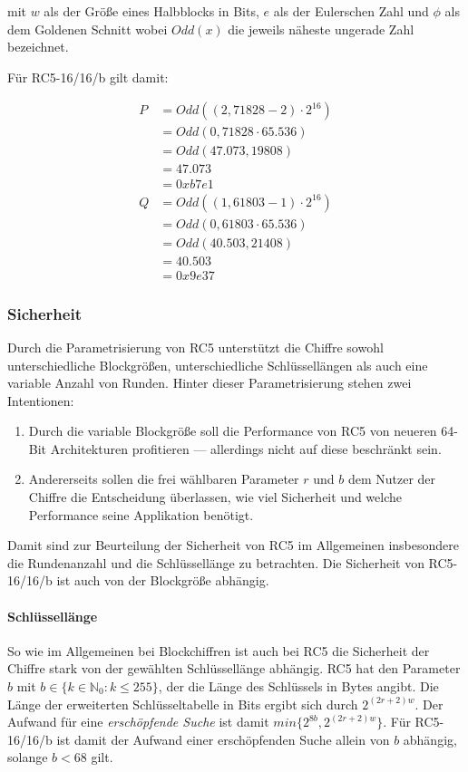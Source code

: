 \documentclass[course=erap]{aspdoc}
\begin{document}
mit $w$ als der Größe eines Halbblocks in Bits, $e$ als der Eulerschen Zahl und $\phi$ als dem Goldenen Schnitt wobei $Odd(x)$ die jeweils näheste ungerade Zahl bezeichnet.\bigbreak

Für RC5-16/16/b gilt damit:

\begin{align*}
    P &= Odd((2,71828 - 2) \cdot 2^{16}) \\
      &= Odd(0,71828 \cdot 65.536) \\
      &= Odd(47.073,19808) \\
      &= 47.073 \\
      &= 0xb7e1 \\
    Q &= Odd((1,61803 - 1) \cdot 2^{16}) \\
      &= Odd(0,61803 \cdot 65.536) \\
      &= Odd(40.503,21408) \\
      &= 40.503 \\
      &= 0x9e37
\end{align*}

\subsubsection{Sicherheit}
\label{sec:Sicherheit}

Durch die Parametrisierung von RC5\cite[p.2]{rc5rev} unterstützt die Chiffre sowohl unterschiedliche Blockgrößen, unterschiedliche Schlüssellängen als auch eine variable Anzahl von Runden. Hinter dieser Parametrisierung stehen zwei Intentionen:

\begin{enumerate}
    \item Durch die variable Blockgröße soll die Performance von RC5 von neueren 64-Bit Architekturen profitieren --- allerdings nicht auf diese beschränkt sein.\cite[p.1]{rc5rev}
    \item Andererseits sollen die frei wählbaren Parameter $r$ und $b$ dem Nutzer der Chiffre die Entscheidung überlassen, wie viel Sicherheit und welche Performance seine Applikation benötigt.\cite[p.1]{rc5rev}
\end{enumerate}

Damit sind zur Beurteilung der Sicherheit von RC5 im Allgemeinen insbesondere die Rundenanzahl und die Schlüssellänge zu betrachten. Die Sicherheit von RC5-16/16/b ist auch von der Blockgröße abhängig.

\paragraph{Schlüssellänge} So wie im Allgemeinen bei Blockchiffren ist auch bei RC5 die Sicherheit der Chiffre stark von der gewählten Schlüssellänge abhängig. RC5 hat den Parameter $b$ mit $b \in \{k \in \mathbb{N}_0 \colon k \leq 255\}$, der die Länge des Schlüssels in Bytes angibt.\cite[p.3]{rc5rev} Die Länge der erweiterten Schlüsseltabelle in Bits ergibt sich durch $2^{(2r + 2)w}$.\cite[p.2]{rc5rev} Der Aufwand für eine \textit{erschöpfende Suche} ist damit $min\{2^{8b}, 2^{(2r + 2)w}\}$.\cite[p.29]{kaliski+yin} Für RC5-16/16/b ist damit der Aufwand einer erschöpfenden Suche allein von $b$ abhängig, solange $b < 68$ gilt.\bigbreak
\end{document}
